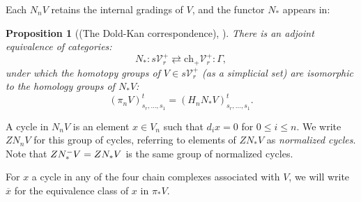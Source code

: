 \documentclass[11pt]{amsart} \renewcommand{\baselinestretch}{1.2}
\theoremstyle{plain}
\newtheorem{prop}[thm]{Proposition}
\theoremstyle{definition}
\newcommand{\calV}{\mathcal{V}}
\newcommand{\citeBOX}[2][]{\cite[\mbox{#1}]{#2}}
\newcommand{\vect}[2]{\calV^{#1}_{#2}}
\newcommand{\Nop}{N^{\smash{-}}}
\newcommand{\complexes}{\mathrm{ch}_+}
\begin{document}
\begin{Conventions and notation}
Each $N_nV$ retains the internal gradings of $V$, and the functor $N_*$ appears in:
\begin{prop}[(The Dold-Kan correspondence), {\citeBOX[\S III.2]{goerss-jardine.pdf}}]
There is an adjoint equivalence of categories:
\[N_*:s\vect{+}{r}\rightleftarrows \complexes \vect{+}{r}:\Gamma,\]
under which the homotopy groups of $V\in s\vect{+}{r}$ (as a simplicial set)  are isomorphic to the homology groups of $N_*V$:
\[(\pi_n V)_{s_r,\ldots,s_1}^t=(H_n N_*V)_{s_r,\ldots,s_1}^t.\]
\end{prop}


%
A cycle in $N_nV$ is an element $x\in V_n$ such that $d_ix=0$ for $0\leq i\leq n$. We write $ZN_nV$ for this group of cycles, referring to elements of $ZN_*V$ as \emph{normalized cycles}. Note that $Z\Nop_*V=ZN_*V$ is the same group of normalized cycles.

For $x$ a cycle in any of the four chain complexes associated with $V$, we will write $\overline{x}$ for the equivalence class of $x$ in $\pi_*V$.


\end{Conventions and notation}
\end{document}
